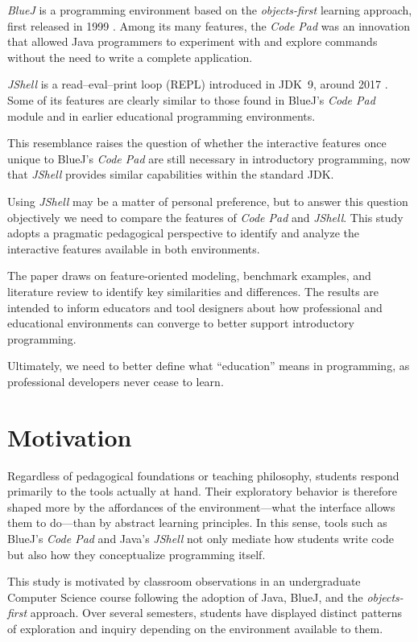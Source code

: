 \documentclass{article}
\begin{document}
\textit{BlueJ} is a programming environment based on the \textit{objects-first} learning approach, first released in 1999 \cite{barnes2008objects, bluej_paper}. Among its many features, the \textit{Code Pad} was an innovation that allowed Java programmers to experiment with and explore commands without the need to write a complete application.

\textit{JShell} is a read–eval–print loop (REPL) introduced in JDK~9, around 2017 \cite{jshell_docs}. Some of its features are clearly similar to those found in BlueJ’s \textit{Code Pad} module and in earlier educational programming environments.

This resemblance raises the question of whether the interactive features once unique to BlueJ’s \textit{Code Pad} are still necessary in introductory programming, now that \textit{JShell} provides similar capabilities within the standard JDK.

Using \textit{JShell} may be a matter of personal preference, but to answer this question objectively we need to compare the features of \textit{Code Pad} and \textit{JShell}. This study adopts a pragmatic pedagogical perspective to identify and analyze the interactive features available in both environments.

The paper draws on feature-oriented modeling, benchmark examples, and literature review to identify key similarities and differences. The results are intended to inform educators and tool designers about how professional and educational environments can converge to better support introductory programming.

Ultimately, we need to better define what “education” means in programming, as professional developers never cease to learn. 

\section{Motivation}

Regardless of pedagogical foundations or teaching philosophy, students respond primarily to the tools actually at hand. Their exploratory behavior is therefore shaped more by the affordances of the environment—what the interface allows them to do—than by abstract learning principles. In this sense, tools such as BlueJ’s \textit{Code Pad} and Java’s \textit{JShell} not only mediate how students write code but also how they conceptualize programming itself.

This study is motivated by classroom observations in an undergraduate Computer Science course following the adoption of Java, BlueJ, and the \textit{objects-first} approach. Over several semesters, students have displayed distinct patterns of exploration and inquiry depending on the environment available to them.
\end{document}
